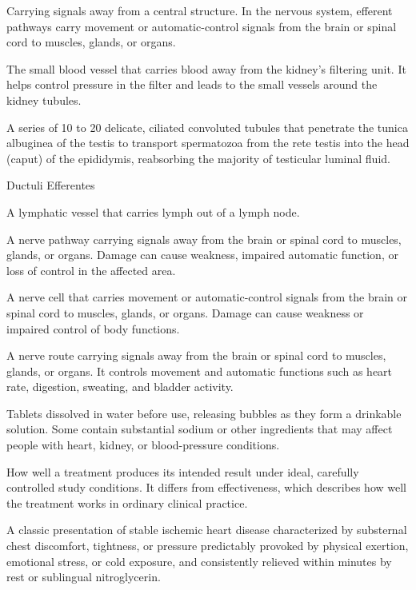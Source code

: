  Carrying signals away from a central structure. In the nervous system, efferent pathways carry movement or automatic-control signals from the brain or spinal cord to muscles, glands, or organs.

 The small blood vessel that carries blood away from the kidney’s filtering unit. It helps control pressure in the filter and leads to the small vessels around the kidney tubules.

 A series of 10 to 20 delicate, ciliated convoluted tubules that penetrate the tunica albuginea of the testis to transport spermatozoa from the rete testis into the head (caput) of the epididymis, reabsorbing the majority of testicular luminal fluid.

\synonyms
Ductuli Efferentes

 A lymphatic vessel that carries lymph out of a lymph node.

 A nerve pathway carrying signals away from the brain or spinal cord to muscles, glands, or organs. Damage can cause weakness, impaired automatic function, or loss of control in the affected area.

 A nerve cell that carries movement or automatic-control signals from the brain or spinal cord to muscles, glands, or organs. Damage can cause weakness or impaired control of body functions.

 A nerve route carrying signals away from the brain or spinal cord to muscles, glands, or organs. It controls movement and automatic functions such as heart rate, digestion, sweating, and bladder activity.

 Tablets dissolved in water before use, releasing bubbles as they form a drinkable solution. Some contain substantial sodium or other ingredients that may affect people with heart, kidney, or blood-pressure conditions.

 How well a treatment produces its intended result under ideal, carefully controlled study conditions. It differs from effectiveness, which describes how well the treatment works in ordinary clinical practice.

 A classic presentation of stable ischemic heart disease characterized by substernal chest discomfort, tightness, or pressure predictably provoked by physical exertion, emotional stress, or cold exposure, and consistently relieved within minutes by rest or sublingual nitroglycerin.

